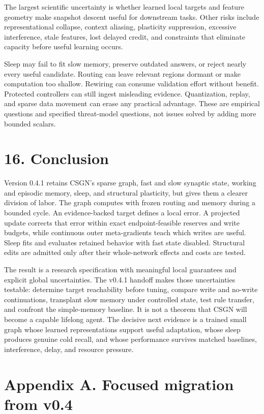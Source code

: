 \documentclass[
  11pt,
  a4paper,
]{article}
\begin{document}
The largest scientific uncertainty is whether learned local targets and
feature geometry make snapshot descent useful for downstream tasks.
Other risks include representational collapse, context aliasing,
plasticity suppression, excessive interference, stale features, lost
delayed credit, and constraints that eliminate capacity before useful
learning occurs.

Sleep may fail to fit slow memory, preserve outdated answers, or reject
nearly every useful candidate. Routing can leave relevant regions
dormant or make computation too shallow. Rewiring can consume validation
effort without benefit. Protected controllers can still ingest
misleading evidence. Quantization, replay, and sparse data movement can
erase any practical advantage. These are empirical questions and
specified threat-model questions, not issues solved by adding more
bounded scalars.

\section{16. Conclusion}\label{conclusion}

Version 0.4.1 retains CSGN's sparse graph, fast and slow synaptic state,
working and episodic memory, sleep, and structural plasticity, but gives
them a clearer division of labor. The graph computes with frozen routing
and memory during a bounded cycle. An evidence-backed target defines a
local error. A projected update corrects that error within exact
endpoint-feasible reserves and write budgets, while continuous outer
meta-gradients teach which writes are useful. Sleep fits and evaluates
retained behavior with fast state disabled. Structural edits are
admitted only after their whole-network effects and costs are tested.

The result is a research specification with meaningful local guarantees
and explicit global uncertainties. The v0.4.1 handoff makes those
uncertainties testable: determine target reachability before tuning,
compare write and no-write continuations, transplant slow memory under
controlled state, test rule transfer, and confront the simple-memory
baseline. It is not a theorem that CSGN will become a capable lifelong
agent. The decisive next evidence is a trained small graph whose learned
representations support useful adaptation, whose sleep produces genuine
cold recall, and whose performance survives matched baselines,
interference, delay, and resource pressure.

\section{Appendix A. Focused migration from
v0.4}\label{appendix-a.-focused-migration-from-v0.4}
\end{document}
